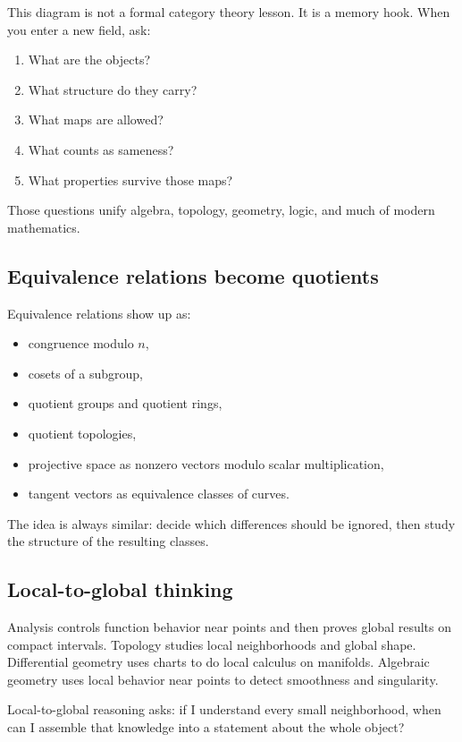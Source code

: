 This diagram is not a formal category theory lesson. It is a memory hook. When you enter a new field, ask:

\begin{enumerate}
\item What are the objects?
\item What structure do they carry?
\item What maps are allowed?
\item What counts as sameness?
\item What properties survive those maps?
\end{enumerate}

Those questions unify algebra, topology, geometry, logic, and much of modern mathematics.

\subsection{Equivalence relations become quotients}

Equivalence relations show up as:

\begin{itemize}
\item congruence modulo $n$,
\item cosets of a subgroup,
\item quotient groups and quotient rings,
\item quotient topologies,
\item projective space as nonzero vectors modulo scalar multiplication,
\item tangent vectors as equivalence classes of curves.
\end{itemize}

The idea is always similar: decide which differences should be ignored, then
study the structure of the resulting classes.

\subsection{Local-to-global thinking}

Analysis controls function behavior near points and then proves global results
on compact intervals. Topology studies local neighborhoods and global shape.
Differential geometry uses charts to do local calculus on manifolds. Algebraic
geometry uses local behavior near points to detect smoothness and singularity.

\begin{intuitionbox}
Local-to-global reasoning asks: if I understand every small neighborhood, when
can I assemble that knowledge into a statement about the whole object?
\end{intuitionbox}

